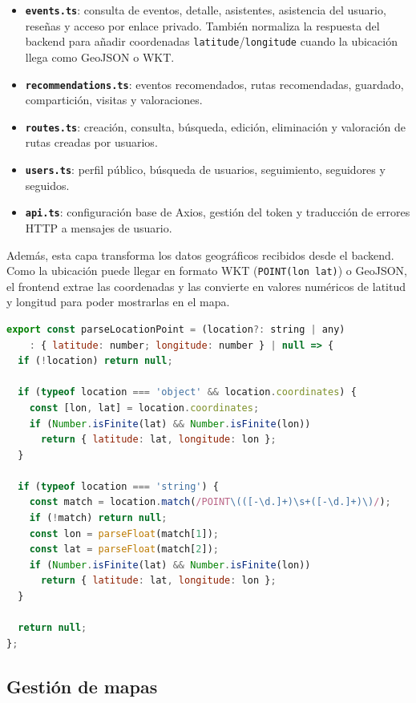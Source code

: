\begin{itemize}
    \item \textbf{\texttt{events.ts}}: consulta de eventos, detalle, asistentes, asistencia del usuario, reseñas y acceso por enlace privado. También normaliza la respuesta del backend para añadir coordenadas \texttt{latitude}/\texttt{longitude} cuando la ubicación llega como GeoJSON o WKT.
    \item \textbf{\texttt{recommendations.ts}}: eventos recomendados, rutas recomendadas, guardado, compartición, visitas y valoraciones.
    \item \textbf{\texttt{routes.ts}}: creación, consulta, búsqueda, edición, eliminación y valoración de rutas creadas por usuarios.
    \item \textbf{\texttt{users.ts}}: perfil público, búsqueda de usuarios, seguimiento, seguidores y seguidos.
    \item \textbf{\texttt{api.ts}}: configuración base de Axios, gestión del token y traducción de errores HTTP a mensajes de usuario.
\end{itemize}

Además, esta capa transforma los datos geográficos recibidos desde el backend. Como la ubicación puede llegar en formato WKT (\texttt{POINT(lon lat)}) o GeoJSON, el frontend extrae las coordenadas y las convierte en valores numéricos de latitud y longitud para poder mostrarlas en el mapa.

\begin{lstlisting}[language=JavaScript, caption={Función de parseo de coordenadas geográficas en el frontend}]
export const parseLocationPoint = (location?: string | any)
    : { latitude: number; longitude: number } | null => {
  if (!location) return null;

  if (typeof location === 'object' && location.coordinates) {
    const [lon, lat] = location.coordinates;
    if (Number.isFinite(lat) && Number.isFinite(lon))
      return { latitude: lat, longitude: lon };
  }

  if (typeof location === 'string') {
    const match = location.match(/POINT\(([-\d.]+)\s+([-\d.]+)\)/);
    if (!match) return null;
    const lon = parseFloat(match[1]);
    const lat = parseFloat(match[2]);
    if (Number.isFinite(lat) && Number.isFinite(lon))
      return { latitude: lat, longitude: lon };
  }

  return null;
};
\end{lstlisting}

\subsection{Gestión de mapas}

